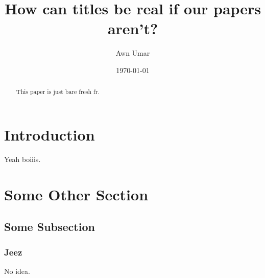 \documentclass{article}
\title{How can titles be real if our papers aren't?}
\author{Awn Umar}
\date{\today}
\begin{document}
\maketitle
\newpage

\tableofcontents
\newpage

\begin{abstract}
This paper is just bare fresh fr.\\
\end{abstract}

\section{Introduction}

Yeah boiiis\cite{the-risks-of-key-recovery-key-escrow-and-trusted-third-party-encryption}.

\section{Some Other Section}

\subsection{Some Subsection}

\subsubsection{Jeez}

No idea\cite{protocol-failure-in-the-escrowed-encryption-standard}.

\printbibliography[
heading=bibintoc,
title={References}
]
\end{document}
